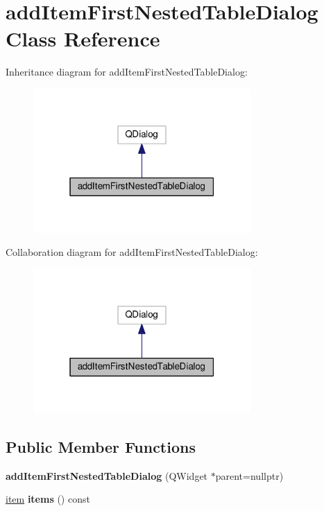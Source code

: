 \hypertarget{classaddItemFirstNestedTableDialog}{}\section{add\+Item\+First\+Nested\+Table\+Dialog Class Reference}
\label{classaddItemFirstNestedTableDialog}


Inheritance diagram for add\+Item\+First\+Nested\+Table\+Dialog\+:\nopagebreak
\begin{figure}[H]
\begin{center}
\leavevmode
\includegraphics[width=235pt]{classaddItemFirstNestedTableDialog__inherit__graph}
\end{center}
\end{figure}


Collaboration diagram for add\+Item\+First\+Nested\+Table\+Dialog\+:\nopagebreak
\begin{figure}[H]
\begin{center}
\leavevmode
\includegraphics[width=235pt]{classaddItemFirstNestedTableDialog__coll__graph}
\end{center}
\end{figure}
\subsection*{Public Member Functions}
\begin{DoxyCompactItemize}
\item 
{\bfseries add\+Item\+First\+Nested\+Table\+Dialog} (Q\+Widget $\ast$parent=nullptr)\hypertarget{classaddItemFirstNestedTableDialog_a0562a4a6147c4b8db2cd1208399dbe35}{}\label{classaddItemFirstNestedTableDialog_a0562a4a6147c4b8db2cd1208399dbe35}

\item 
\hyperlink{classitem}{item} {\bfseries items} () const \hypertarget{classaddItemFirstNestedTableDialog_acb196230bb4ee8d22d19049d4ad66480}{}\label{classaddItemFirstNestedTableDialog_acb196230bb4ee8d22d19049d4ad66480}

\end{DoxyCompactItemize}


